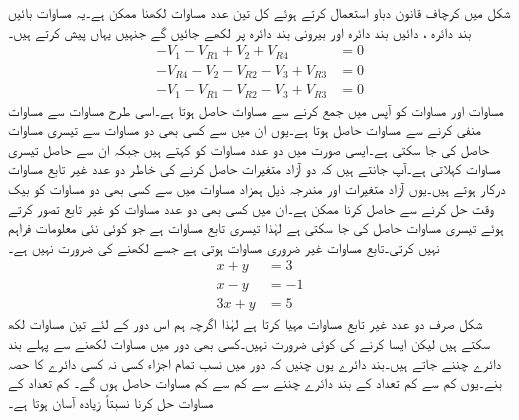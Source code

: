 شکل  میں کرچاف قانون دباو استعمال کرتے ہوئے کل تین عدد مساوات لکھنا ممکن ہے۔یہ مساوات بائیں بند دائرہ ، دائیں بند دائرہ  اور بیرونی بند دائرہ  پر لکھے جائیں گے جنہیں یہاں پیش کرتے ہیں۔
\begin{align}
-V_1-V_{R1}+V_2+V_{R4}&=0  \label{مساوات_مزاحمتی_تابع_الف}\\
-V_{R4}-V_2-V_{R2}-V_3+V_{R3}&=0  \label{مساوات_مزاحمتی_تابع_ب}\\
-V_1-V_{R1}-V_{R2}-V_3+V_{R3}&=0  \label{مساوات_مزاحمتی_تابع_پ}
\end{align}
مساوات  اور مساوات  کو آپس میں جمع کرنے سے مساوات  حاصل ہوتا ہے۔اسی طرح مساوات  سے مساوات  منفی کرنے سے مساوات  حاصل ہوتا ہے۔یوں ان میں سے کسی بھی دو مساوات سے تیسری مساوات حاصل کی جا سکتی ہے۔ایسی صورت میں دو عدد مساوات کو  کہتے ہیں جبکہ ان سے حاصل تیسری مساوات  کہلاتی ہے۔آپ جانتے ہیں کہ دو آزاد متغیرات حاصل کرنے کی خاطر دو عدد غیر تابع مساوات درکار ہوتے ہیں۔یوں آزاد متغیرات  اور  مندرجہ ذیل ہمزاد مساوات  میں سے کسی بھی دو مساوات کو بیک وقت حل کرنے سے حاصل کرنا ممکن ہے۔ان میں کسی بھی دو عدد مساوات کو غیر تابع تصور کرتے ہوئے تیسری مساوات حاصل کی جا سکتی ہے لہٰذا تیسری تابع مساوات ہے جو کوئی نئی معلومات فراہم نہیں کرتی۔تابع مساوات غیر ضروری مساوات ہوتی ہے جسے لکھنے کی ضرورت نہیں ہے۔
\begin{align*}
x+y&=3\\
x-y&=-1\\
3x+y&=5
\end{align*}
شکل  صرف دو عدد غیر تابع مساوات مہیا کرتا ہے لہٰذا اگرچہ ہم اس دور کے لئے تین مساوات لکھ سکتے ہیں لیکن ایسا کرنے کی کوئی ضرورت نہیں۔کسی بھی دور میں مساوات لکھنے سے پہلے بند دائرے چننے جاتے ہیں۔بند دائرے یوں چنیں کہ دور میں نسب تمام اجزاء کسی نہ کسی دائرے کا حصہ بنے۔یوں کم سے کم تعداد کے بند دائرے چننے سے کم سے کم مساوات حاصل ہوں گے۔ کم تعداد کے مساوات حل کرنا نسبتاً زیادہ آسان ہوتا ہے۔

